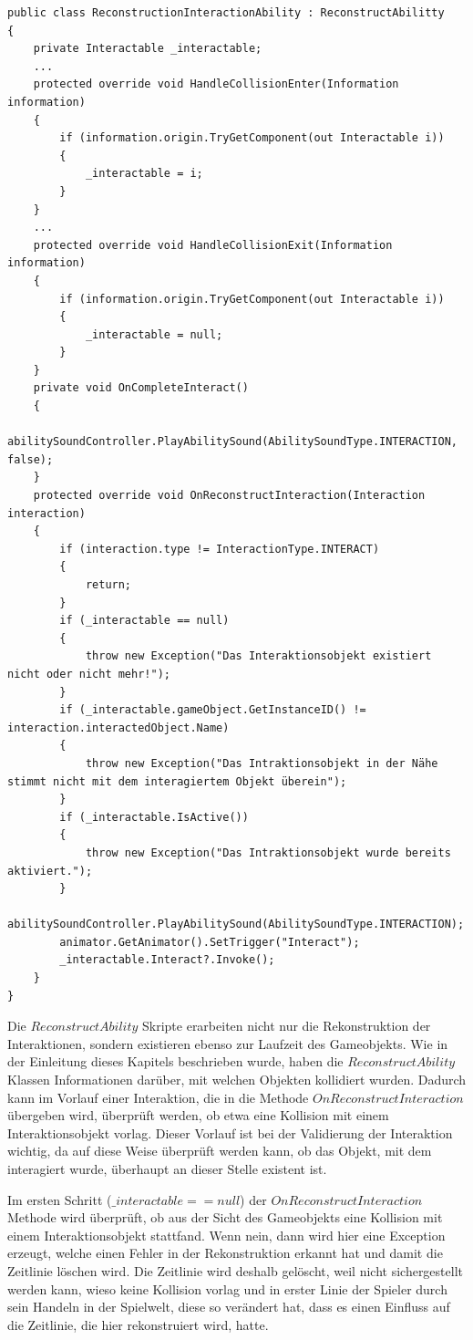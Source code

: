 \begin{lstlisting}[caption={Ausschnitt aus ReconstructionInteractionAbility.cs}, label={lst:reconstruction-interaction-ability}]
public class ReconstructionInteractionAbility : ReconstructAbilitty
{
    private Interactable _interactable;
    ...
    protected override void HandleCollisionEnter(Information information)
    {
        if (information.origin.TryGetComponent(out Interactable i))
        {
            _interactable = i;
        }
    }
    ...
    protected override void HandleCollisionExit(Information information)
    {
        if (information.origin.TryGetComponent(out Interactable i))
        {
            _interactable = null;
        }
    }
    private void OnCompleteInteract()
    {
        abilitySoundController.PlayAbilitySound(AbilitySoundType.INTERACTION, false);
    }
    protected override void OnReconstructInteraction(Interaction interaction)
    {
        if (interaction.type != InteractionType.INTERACT)
        {
            return;
        }
        if (_interactable == null)
        {
            throw new Exception("Das Interaktionsobjekt existiert nicht oder nicht mehr!");
        }
        if (_interactable.gameObject.GetInstanceID() != interaction.interactedObject.Name)
        {
            throw new Exception("Das Intraktionsobjekt in der Nähe stimmt nicht mit dem interagiertem Objekt überein");
        }
        if (_interactable.IsActive())
        {
            throw new Exception("Das Intraktionsobjekt wurde bereits aktiviert.");
        }
        abilitySoundController.PlayAbilitySound(AbilitySoundType.INTERACTION);
        animator.GetAnimator().SetTrigger("Interact");
        _interactable.Interact?.Invoke();
    }
}
\end{lstlisting}

Die $ReconstructAbility$ Skripte erarbeiten nicht nur die Rekonstruktion der Interaktionen, sondern existieren ebenso zur Laufzeit des Gameobjekts. Wie in der Einleitung dieses Kapitels beschrieben wurde, haben die $ReconstructAbility$ Klassen Informationen darüber, mit welchen Objekten kollidiert wurden. Dadurch kann im Vorlauf einer Interaktion, die in die Methode $OnReconstructInteraction$ übergeben wird, überprüft werden, ob etwa eine Kollision mit einem Interaktionsobjekt vorlag. Dieser Vorlauf ist bei der Validierung der Interaktion wichtig, da auf diese Weise überprüft werden kann, ob das Objekt, mit dem interagiert wurde, überhaupt an dieser Stelle existent ist. 

Im ersten Schritt ($\_interactable == null$) der $OnReconstructInteraction$ Methode wird überprüft, ob aus der Sicht des Gameobjekts eine Kollision mit einem Interaktionsobjekt stattfand. Wenn nein, dann wird hier eine Exception erzeugt, welche einen Fehler in der Rekonstruktion erkannt hat und damit die Zeitlinie löschen wird. Die Zeitlinie wird deshalb gelöscht, weil nicht sichergestellt werden kann, wieso keine Kollision vorlag und in erster Linie der Spieler durch sein Handeln in der Spielwelt, diese so verändert hat, dass es einen Einfluss auf die Zeitlinie, die hier rekonstruiert wird, hatte.

